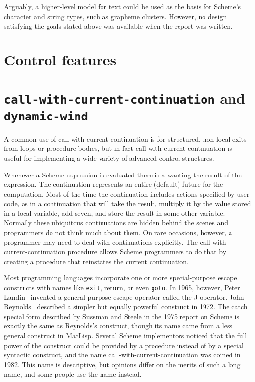 \documentclass[twoside,twocolumn]{algol60}
\begin{document}
Arguably, a higher-level model for text could be used as the basis for
Scheme's character and string types, such as grapheme clusters.
However, no design satisfying the goals stated above was available
when the report was written.

\section{Control features}

\section{{\tt call-with-current-continuation} and {\tt dynamic-wind}}

\vest A common use of {\cf call-with-current-continuation} is for
structured, non-local exits from loops or procedure bodies, but in fact
{\cf call-with-current-continuation} is useful for implementing a
wide variety of advanced control structures.

\vest Whenever a Scheme expression is evaluated there is a
 wanting the result of the expression.  The continuation
represents an entire (default) future for the computation.
Most of the time the continuation includes actions
specified by user code, as in a continuation that will take the result,
multiply it by the value stored in a local variable, add seven, and store
the result in some other variable.  Normally these
ubiquitous continuations are hidden behind the scenes and programmers do not
think much about them.  On rare occasions, however, a programmer may
need to deal with continuations explicitly.
The {\cf call-with-current-continuation} procedure allows Scheme programmers to do
that by creating a procedure that reinstates the current continuation.

\vest Most programming languages incorporate one or more special-purpose
escape constructs with names like {\tt exit}, \hbox{{\cf return}}, or
even {\tt goto}.  In 1965, however, Peter Landin~\cite{Landin65}
invented a general purpose escape operator called the J-operator.  John
Reynolds~\cite{Reynolds72} described a simpler but equally powerful
construct in 1972.  The {\cf catch} special form described by Sussman
and Steele in the 1975 report on Scheme is exactly the same as
Reynolds's construct, though its name came from a less general construct
in MacLisp.  Several Scheme implementors noticed that the full power of the
 construct could be provided by a procedure instead of by a
special syntactic construct, and the name
{\cf call-with-current-continuation} was coined in 1982.  This name is
descriptive, but opinions differ on the merits of such a long name, and
some people use the name  instead.
\end{document}
